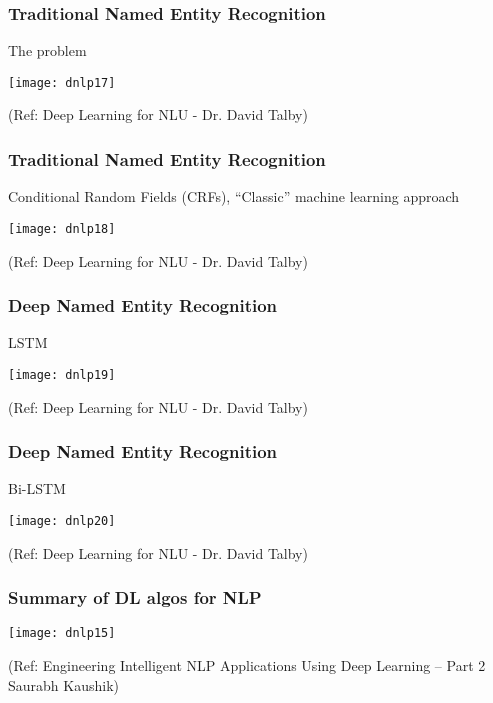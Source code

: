 \begin{frame}[fragile]\frametitle{Traditional Named Entity Recognition}
The problem
\begin{center}
\texttt{[image: dnlp17]}

\tiny{(Ref: Deep Learning for NLU - Dr. David Talby)}
\end{center}

\end{frame}

\begin{frame}[fragile]\frametitle{Traditional Named Entity Recognition}
Conditional Random Fields (CRFs), ``Classic'' machine learning approach

\begin{center}
\texttt{[image: dnlp18]}

\tiny{(Ref: Deep Learning for NLU - Dr. David Talby)}
\end{center}

\end{frame}

\begin{frame}[fragile]\frametitle{Deep Named Entity Recognition}
LSTM

\begin{center}
\texttt{[image: dnlp19]}

\tiny{(Ref: Deep Learning for NLU - Dr. David Talby)}
\end{center}

\end{frame}

\begin{frame}[fragile]\frametitle{Deep Named Entity Recognition}
Bi-LSTM

\begin{center}
\texttt{[image: dnlp20]}

\tiny{(Ref: Deep Learning for NLU - Dr. David Talby)}
\end{center}

\end{frame}



\begin{frame}[fragile]\frametitle{ Summary of DL algos for NLP}
\begin{center}
\texttt{[image: dnlp15]}

\tiny{(Ref: Engineering Intelligent NLP Applications Using Deep Learning –  Part 2  Saurabh Kaushik)}
\end{center}


\end{frame}




